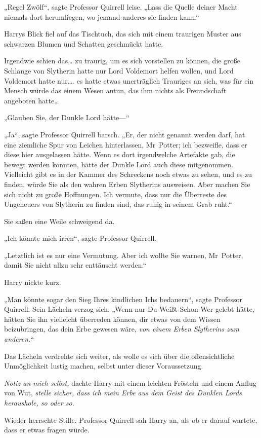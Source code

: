 {„Regel Zwölf“, sagte Professor Quirrell leise. „Lass die Quelle deiner Macht niemals dort herumliegen, wo jemand anderes sie finden kann.“

Harrys Blick fiel auf das Tischtuch, das sich mit einem traurigen Muster aus schwarzen Blumen und Schatten geschmückt hatte.

Irgendwie schien das… zu traurig, um es sich vorstellen zu können, die große Schlange von Slytherin hatte nur Lord Voldemort helfen wollen, und Lord Voldemort hatte nur…. es hatte etwas unerträglich Trauriges an sich, was für ein Mensch würde das einem Wesen antun, das ihm nichts als Freundschaft angeboten hatte…

„Glauben Sie, der Dunkle Lord hätte—“

„Ja“, sagte Professor Quirrell barsch. „Er, der nicht genannt werden darf, hat eine ziemliche Spur von Leichen hinterlassen, Mr~Potter; ich bezweifle, dass er diese hier ausgelassen hätte. Wenn es dort irgendwelche Artefakte gab, die bewegt werden konnten, hätte der Dunkle Lord auch diese mitgenommen. Vielleicht gibt es in der Kammer des Schreckens noch etwas zu sehen, und es zu finden, würde Sie als den wahren Erben Slytherins ausweisen. Aber machen Sie sich nicht zu große Hoffnungen. Ich vermute, dass nur die Überreste des Ungeheuers von Slytherin zu finden sind, das ruhig in seinem Grab ruht.“

Sie saßen eine Weile schweigend da.

„Ich könnte mich irren“, sagte Professor Quirrell.

„Letztlich ist es nur eine Vermutung. Aber ich wollte Sie warnen, Mr~Potter, damit Sie nicht allzu sehr enttäuscht werden.“

Harry nickte kurz.

„Man könnte sogar den Sieg Ihres kindlichen Ichs bedauern“, sagte Professor Quirrell. Sein Lächeln verzog sich. „Wenn nur Du-Weißt-Schon-Wer gelebt hätte, hätten Sie ihn vielleicht überreden können, dir etwas von dem Wissen beizubringen, das dein Erbe gewesen wäre, \emph{von einem Erben Slytherins zum anderen.}“

Das Lächeln verdrehte sich weiter, als wolle es sich über die offensichtliche Unmöglichkeit lustig machen, selbst unter dieser Voraussetzung.

\emph{Notiz an mich selbst,} dachte Harry mit einem leichten Frösteln und einem Anflug von Wut, \emph{stelle sicher, dass ich mein Erbe aus dem Geist des Dunklen Lords heraushole, so oder so.}

Wieder herrschte Stille. Professor Quirrell sah Harry an, als ob er darauf wartete, dass er etwas fragen würde.

}
